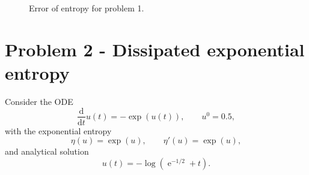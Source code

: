 \documentclass{report}
\renewcommand{\exp}[1]{\operatorname{e}^{#1}}
\newcommand{\expalt}{\operatorname{exp}}
\begin{document}
    \begin{figure}[H]
        \centering
        \hfill
        \hfill
        \caption{Error of entropy for problem 1.}\label{Fig10}
    \end{figure}


\section{Problem 2 - Dissipated exponential entropy}
    Consider the ODE
    \[\frac{\text{d}}{\text{d}t} u(t) = -\expalt(u(t)), \qquad u^0 = 0.5,\]
    with the exponential entropy
    \[\eta(u) = \expalt(u), \qquad \eta'(u) = \expalt(u),\]
    and analytical solution
    \[u(t) = -\log(\exp{-1/2}+t).\]
\end{document}
